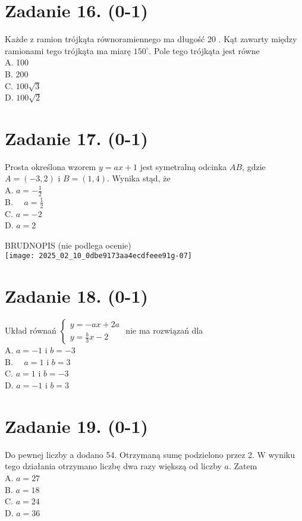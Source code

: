 \documentclass[10pt]{article}
\begin{document}
\section*{Zadanie 16. (0-1)}
Każde z ramion trójkąta równoramiennego ma długość 20 . Kąt zawarty między ramionami tego trójkąta ma miarę \(150^{\circ}\). Pole tego trójkąta jest równe\\
A. 100\\
B. 200\\
C. \(100 \sqrt{3}\)\\
D. \(100 \sqrt{2}\)

\section*{Zadanie 17. (0-1)}
Prosta określona wzorem \(y=a x+1\) jest symetralną odcinka \(A B\), gdzie \(A=(-3,2)\) i \(B=(1,4)\). Wynika stąd, że\\
A. \(a=-\frac{1}{2}\)\\
B. \(\quad a=\frac{1}{2}\)\\
C. \(a=-2\)\\
D. \(a=2\)

BRUDNOPIS (nie podlega ocenie)\\
\texttt{[image: 2025\_02\_10\_0dbe9173aa4ecdfeee91g-07]}

\section*{Zadanie 18. (0-1)}
Układ równań \(\left\{\begin{array}{l}y=-a x+2 a \\ y=\frac{b}{3} x-2\end{array}\right.\) nie ma rozwiązań dla\\
A. \(a=-1\) i \(b=-3\)\\
B. \(\quad a=1\) i \(b=3\)\\
C. \(a=1\) i \(b=-3\)\\
D. \(a=-1\) i \(b=3\)

\section*{Zadanie 19. (0-1)}
Do pewnej liczby a dodano 54. Otrzymaną sumę podzielono przez 2. W wyniku tego działania otrzymano liczbę dwa razy większą od liczby \(a\). Zatem\\
A. \(a=27\)\\
B. \(a=18\)\\
C. \(a=24\)\\
D. \(a=36\)
\end{document}
